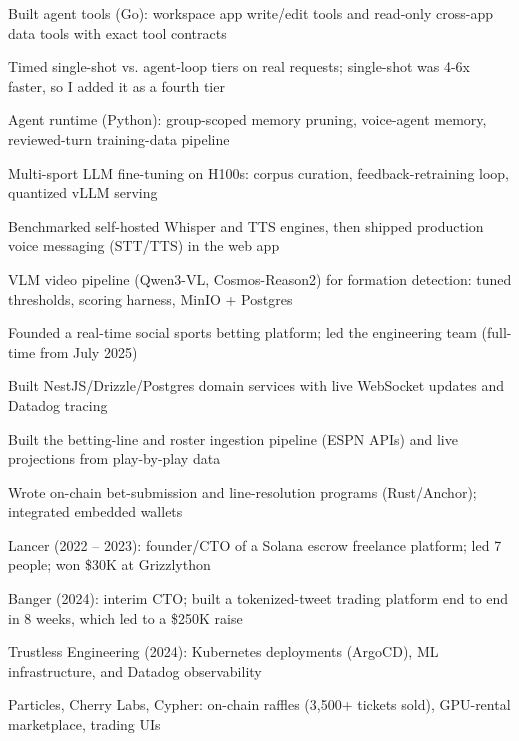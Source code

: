 \documentclass[print]{jack-resume}
\begin{document}
\begin{tightemize}
    \item Built agent tools (Go): workspace app write/edit tools and read-only cross-app data tools with exact tool contracts
    \item Timed single-shot vs. agent-loop tiers on real requests; single-shot was 4-6x faster, so I added it as a fourth tier
    \item Agent runtime (Python): group-scoped memory pruning, voice-agent memory, reviewed-turn training-data pipeline
    \item Multi-sport LLM fine-tuning on H100s: corpus curation, feedback-retraining loop, quantized vLLM serving
    \item Benchmarked self-hosted Whisper and TTS engines, then shipped production voice messaging (STT/TTS) in the web app
    \item VLM video pipeline (Qwen3-VL, Cosmos-Reason2) for formation detection: tuned thresholds, scoring harness, MinIO + Postgres
\end{tightemize}
\sectionsep

\begin{tightemize}
    \item Founded a real-time social sports betting platform; led the engineering team (full-time from July 2025)
    \item Built NestJS/Drizzle/Postgres domain services with live WebSocket updates and Datadog tracing
    \item Built the betting-line and roster ingestion pipeline (ESPN APIs) and live projections from play-by-play data
    \item Wrote on-chain bet-submission and line-resolution programs (Rust/Anchor); integrated embedded wallets
\end{tightemize}
\sectionsep

\begin{tightemize}
    \item Lancer (2022 – 2023): founder/CTO of a Solana escrow freelance platform; led 7 people; won \$30K at Grizzlython
    \item Banger (2024): interim CTO; built a tokenized-tweet trading platform end to end in 8 weeks, which led to a \$250K raise
    \item Trustless Engineering (2024): Kubernetes deployments (ArgoCD), ML infrastructure, and Datadog observability
    \item Particles, Cherry Labs, Cypher: on-chain raffles (3,500+ tickets sold), GPU-rental marketplace, trading UIs
\end{tightemize}
\sectionsep
\end{document}
